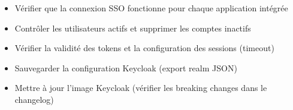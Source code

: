 \documentclass[11pt, a4paper]{article}
\begin{document}
\begin{checklist}
  \begin{itemize}
    \item[$\square$] Vérifier que la connexion SSO fonctionne pour chaque application intégrée
    \item[$\square$] Contrôler les utilisateurs actifs et supprimer les comptes inactifs
    \item[$\square$] Vérifier la validité des tokens et la configuration des sessions (timeout)
    \item[$\square$] Sauvegarder la configuration Keycloak (export realm JSON)
    \item[$\square$] Mettre à jour l'image Keycloak (vérifier les breaking changes dans le changelog)
  \end{itemize}
\end{checklist}
\end{document}
